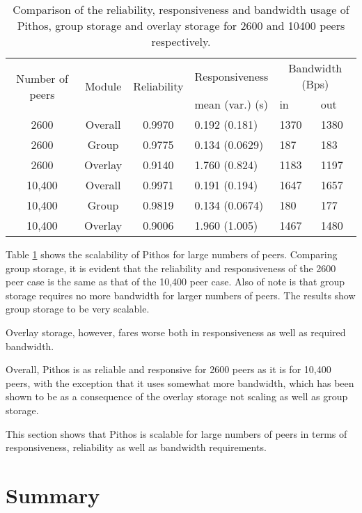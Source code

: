 \begin{table}[htbp]
\centering
\begin{tabular}{|c|c|c|l|l|l|}
\hline
\multirow{2}{*}{Number of peers} & \multirow{2}{*}{Module} & \multirow{2}{*}{Reliability} & Responsiveness  & \multicolumn{2}{c|}{Bandwidth (Bps)} \\
\cline{5-6}
                &        &             &  mean (var.) (s)            &in & out   \\
\hline
2600            & Overall&  0.9970     &   0.192 (0.181)      & 1370&1380 \\
2600            & Group  &  0.9775     &   0.134 (0.0629)     & 187&183   \\
2600            & Overlay&  0.9140     &   1.760 (0.824)      & 1183&1197 \\
10,400          & Overall&  0.9971     &   0.191 (0.194)      & 1647&1657 \\
10,400          & Group  &  0.9819     &   0.134 (0.0674)     & 180&177   \\
10,400          & Overlay&  0.9006     &   1.960 (1.005)      & 1467&1480 \\
\hline
\end{tabular}
\caption{Comparison of the reliability, responsiveness and bandwidth usage of Pithos, group storage and overlay storage for 2600 and 10400 peers respectively.}
\label{tab_pithos_scalability_results}
\end{table}
%
Table \ref{tab_pithos_scalability_results} shows the scalability of Pithos for large numbers of peers. Comparing group storage, it is evident that the reliability and responsiveness of the 2600 peer case is the same as that of the 10,400 peer case. Also of note is that group storage requires no more bandwidth for larger numbers of peers. The results show group storage to be very scalable.

Overlay storage, however, fares worse both in responsiveness as well as required bandwidth.

Overall, Pithos is as reliable and responsive for 2600 peers as it is for 10,400 peers, with the exception that it uses somewhat more bandwidth, which has been shown to be as a consequence of the overlay storage not scaling as well as group storage.

This section shows that Pithos is scalable for large numbers of peers in terms of responsiveness, reliability as well as bandwidth requirements.

\section{Summary}

